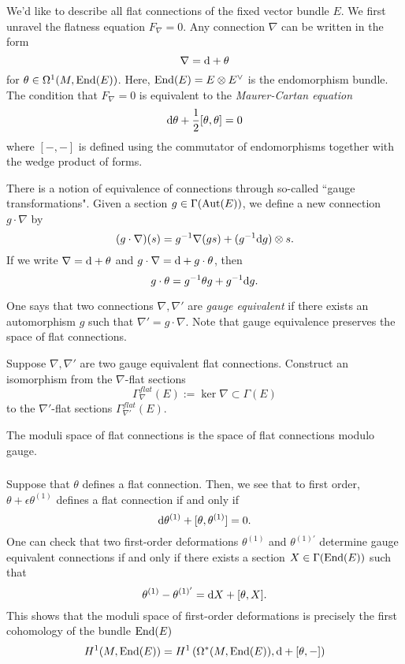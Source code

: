 \documentclass[11pt]{amsart}
\begin{document}
We'd like to describe all flat connections of the fixed vector bundle $E$. 
We first unravel the flatness equation $F_\nabla = 0$. 
Any connection $\nabla$ can be written in the form
\[
\nabla = {\rm d} + \theta
\]
for $\theta \in \Omega^1(M, {\rm End}(E))$. 
Here, ${\rm End}(E)=E \otimes E^\vee$ is the endomorphism bundle. 
The condition that $F_\nabla = 0$ is equivalent to the {\em Maurer-Cartan equation}
\[
{\rm d} \theta + \frac{1}{2} [\theta, \theta] = 0 
\]  
where $[-,-]$ is defined using the commutator of endomorphisms together with the wedge product of forms. 

There is a notion of equivalence of connections through so-called ``gauge transformations". 
Given a section $g \in \Gamma({\rm Aut}(E))$, we define a new connection $g \cdot \nabla$ by
\[
(g \cdot \nabla)(s) = g^{-1} \nabla (g s) + (g^{-1} {\rm d} g) \otimes s .
\]
If we write $\nabla = {\rm d} + \theta$ and $g \cdot \nabla = {\rm d} + g \cdot \theta$, then 
\[
g \cdot \theta = g^{-1} \theta g + g^{-1} {\rm d} g .
\] 

One says that two connections $\nabla,\nabla'$ are {\em gauge equivalent} if there exists an automorphism $g$ such that $\nabla' = g \cdot \nabla$. 
Note that gauge equivalence preserves the space of flat connections. 

\begin{ex}
Suppose $\nabla,\nabla'$ are two gauge equivalent flat connections. 
Construct an isomorphism from the $\nabla$-flat sections 
\[
\Gamma^{flat}_{\nabla}(E) := \ker \nabla \subset \Gamma(E)
\]
to the $\nabla'$-flat sections $\Gamma^{flat}_{\nabla'}(E)$. 
\end{ex}

The moduli space of flat connections is the space of flat connections modulo gauge. 

\subsubsection{}
Suppose that $\theta$ defines a flat connection. 
Then, we see that to first order, $\theta + \epsilon \theta^{(1)}$ defines a flat connection if and only if 
\[
{\rm d} \theta^{(1)} + [\theta, \theta^{(1)}] = 0 .
\] 
One can check that two first-order deformations $\theta^{(1)}$ and $\theta^{(1)'}$ determine gauge equivalent connections if and only if there exists a section $X \in \Gamma({\rm End}(E))$ such that
\[
\theta^{(1)} - \theta^{(1)'} = {\rm d} X + [\theta, X] .
\]
This shows that the moduli space of first-order deformations is precisely the first cohomology of the bundle ${\rm End}(E)$
\[
H^1(M, {\rm End}(E)) = H^1 \left(\Omega^*(M, {\rm End}(E)), {\rm d} + [\theta,-] \right)
\]
\end{document}

